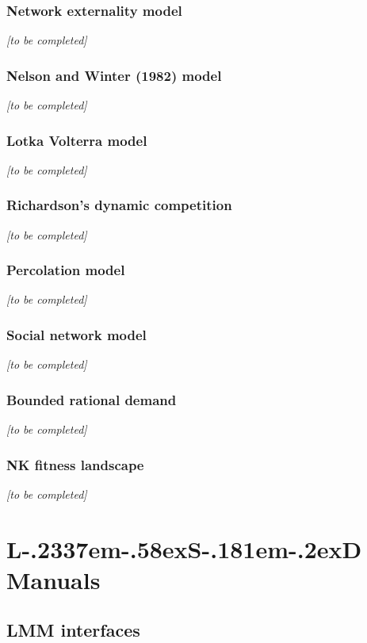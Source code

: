 \documentclass [11pt,a4paper] {book}
\def\LsD{{L\kern-.2337em\lower-.58ex\hbox{S}\kern-.181em\lower-.2ex\hbox{D}}\xspace}
\begin{document}
\subsection{Network externality model}
\textit{[to be completed]}

\subsection{Nelson and Winter (1982) model}
\textit{[to be completed]}

\subsection{Lotka Volterra model}
\textit{[to be completed]}

\subsection{Richardson's dynamic competition}
\textit{[to be completed]}


\subsection{Percolation model}
\textit{[to be completed]}

\subsection{Social network model}
\textit{[to be completed]}


\subsection{Bounded rational demand}
\textit{[to be completed]}


\subsection{NK fitness landscape}
\textit{[to be completed]}

\chapter{\LsD Manuals}\label{ch:manuals}

\section{LMM interfaces}\label{sec:LMM}
\end{document}
